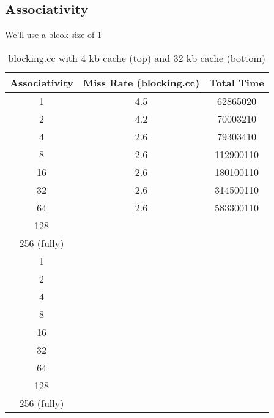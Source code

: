 \documentclass[letterpaper, 12pt, oneside]{memoir}
\begin{document}
\subsection{Associativity}
We'll use a blcok size of 1

\begin{table}[H]
\centering
\begin{tabular}{c|c|c}
    Associativity & Miss Rate (blocking.cc) & Total Time \\ \hline
    1           & 4.5   & 62865020 \\
    2           & 4.2   & 70003210 \\
    4           & 2.6   & 79303410 \\
    8           & 2.6   & 112900110 \\
    16          & 2.6   & 180100110 \\
    32          & 2.6   & 314500110 \\
    64          & 2.6   & 583300110 \\
    128         & & \\
    256 (fully) & & \\ \hline
    1           & & \\
    2           & & \\
    4           & & \\
    8           & & \\
    16          & & \\
    32          & & \\
    64          & & \\
    128         & & \\
    256 (fully) & & \\
\end{tabular}
\caption{blocking.cc with 4 kb cache (top) and 32 kb cache (bottom)}
\end{table}
\end{document}
